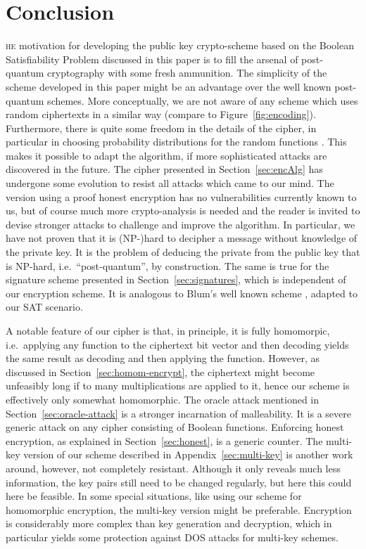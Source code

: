 \documentclass[final,journal,compsoc]{IEEEtran}
\begin{document}
\section{Conclusion\label{sec:conclusion}}
\textsc{he} motivation for developing the public key
crypto-scheme based on the Boolean Satisfiability Problem discussed in
this paper is to fill the arsenal of post-quantum cryptography with
some fresh ammunition. The simplicity of the scheme developed in this
paper might be an advantage over the well known post-quantum
schemes. More conceptually, we are not aware of any scheme which uses
random ciphertexts in a similar way (compare to
Figure~\ref{fig:encoding}).  Furthermore, there is quite some freedom
in the details of the cipher, in particular in choosing
probability distributions for the random functions . This makes
it possible to adapt the algorithm, if more sophisticated attacks are
discovered in the future.  The cipher presented in
Section~\ref{sec:encAlg} has undergone some evolution to resist all
attacks which came to our mind. The version using a proof honest
encryption has no vulnerabilities currently known to us, but of course
much more crypto-analysis is needed and the reader is invited to
devise stronger attacks to challenge and improve the algorithm. In
particular, we have not proven that it is (NP-)hard to decipher a
message without knowledge of the private key.  It is the problem of
deducing the private from the public key that is NP-hard, i.e.\
``post-quantum'', by construction.  The same is true for the signature
scheme presented in Section~\ref{sec:signatures}, which is independent
of our encryption scheme. It is analogous to Blum's well known scheme
\cite{Blum1986}, adapted to our SAT scenario.


A notable feature of our cipher is that, in principle, it is fully
homomorpic, i.e.\ applying any function to the ciphertext bit vector and
then decoding yields the same result as decoding and then applying the
function. However, as discussed in Section~\ref{sec:homom-encrypt},
the ciphertext might become unfeasibly long if to many multiplications are
applied to it, hence our scheme is effectively only somewhat
homomorphic.  The oracle attack mentioned in
Section~\ref{sec:oracle-attack} is a stronger incarnation of
malleability. It is a severe generic attack on
any cipher consisting of Boolean functions.  Enforcing honest
encryption, as explained in Section~\ref{sec:honest}, is a generic
counter.  The multi-key version of our scheme described in
Appendix~\ref{sec:multi-key} is another work
around, however, not completely resistant. Although it only reveals much less information, the key pairs
still need to be changed regularly, but here this could here be feasible. In
some special situations, like using our scheme for homomorphic
encryption, the multi-key version might be
preferable. Encryption is considerably more complex than key
generation and decryption, which in particular yields some protection
against DOS attacks for multi-key schemes.
\end{document}

